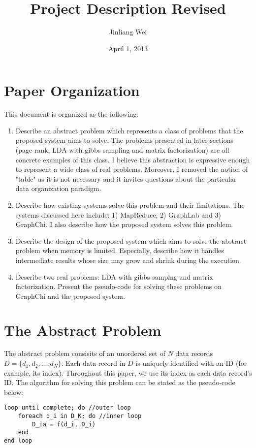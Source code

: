 \documentclass[10pt, twocolumn, a4paper]{article}
\title{\Large \bf Project Description Revised}
\author{Jinliang Wei}
\date{April 1, 2013}
\begin{document}
\maketitle

\section{Paper Organization}
This document is organized as the following:
\begin{enumerate}
\item Describe an abstract problem which represents a class of problems that the proposed system aims to solve. The problems presented in later sections (page rank, LDA with gibbs sampling and matrix factorization) are all concrete examples of this class. I believe this abstraction is expressive enough to represent a wide class of real problems. Moreover, I removed the notion of "table" as it is not necessary and it invites questions about the particular data organization paradigm.
\item Describe how existing systems solve this problem and their limitations. The systems discussed here include: 1) MapReduce, 2) GraphLab and 3) GraphChi. I also describe how the proposed system solves this problem.
\item Describe the design of the proposed system which aims to solve the abstract problem when memory is limited. Especially, describe how it handles intermediate results whose size may grow and shrink during the execution.
\item Describe two real problems: LDA with gibbs samplng and matrix factorization. Present the pseudo-code for solving these problems on GraphChi and the proposed system.
\end{enumerate}

\section{The Abstract Problem}
\label{sec:prob}
The abstract problem consisits of an unordered set of $N$ data records $D = \{d_1, d_2, ..., d_N\}$. Each data record in $D$ is uniquely identified with an ID (for example, its index). Throughout this paper, we use its index as each data record's ID. The algorithm for solving this problem can be stated as the pseudo-code below:
\begin{Verbatim}[samepage=true]
loop until complete; do //outer loop
    foreach d_i in D_K; do //inner loop
        D_ia = f(d_i, D_i)
    end
end loop
\end{Verbatim}
\end{document}
